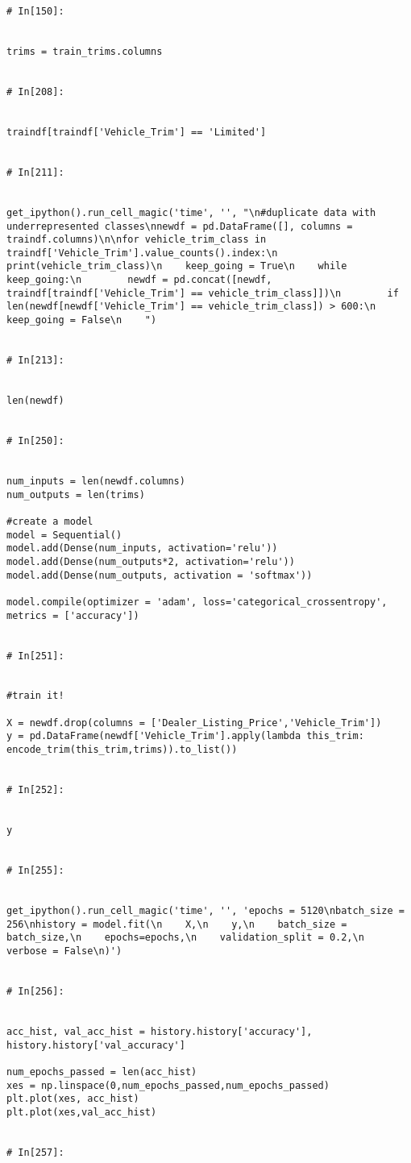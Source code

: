 \begin{verbatim}
# In[150]:


trims = train_trims.columns


# In[208]:


traindf[traindf['Vehicle_Trim'] == 'Limited']


# In[211]:


get_ipython().run_cell_magic('time', '', "\n#duplicate data with underrepresented classes\nnewdf = pd.DataFrame([], columns = traindf.columns)\n\nfor vehicle_trim_class in traindf['Vehicle_Trim'].value_counts().index:\n    print(vehicle_trim_class)\n    keep_going = True\n    while keep_going:\n        newdf = pd.concat([newdf, traindf[traindf['Vehicle_Trim'] == vehicle_trim_class]])\n        if len(newdf[newdf['Vehicle_Trim'] == vehicle_trim_class]) > 600:\n            keep_going = False\n    ")


# In[213]:


len(newdf)


# In[250]:


num_inputs = len(newdf.columns)
num_outputs = len(trims)

#create a model
model = Sequential()
model.add(Dense(num_inputs, activation='relu'))
model.add(Dense(num_outputs*2, activation='relu'))
model.add(Dense(num_outputs, activation = 'softmax'))

model.compile(optimizer = 'adam', loss='categorical_crossentropy', metrics = ['accuracy'])


# In[251]:


#train it!

X = newdf.drop(columns = ['Dealer_Listing_Price','Vehicle_Trim'])
y = pd.DataFrame(newdf['Vehicle_Trim'].apply(lambda this_trim: encode_trim(this_trim,trims)).to_list())


# In[252]:


y


# In[255]:


get_ipython().run_cell_magic('time', '', 'epochs = 5120\nbatch_size = 256\nhistory = model.fit(\n    X,\n    y,\n    batch_size = batch_size,\n    epochs=epochs,\n    validation_split = 0.2,\n    verbose = False\n)')


# In[256]:


acc_hist, val_acc_hist = history.history['accuracy'], history.history['val_accuracy']

num_epochs_passed = len(acc_hist)
xes = np.linspace(0,num_epochs_passed,num_epochs_passed)
plt.plot(xes, acc_hist)
plt.plot(xes,val_acc_hist)


# In[257]:



\end{verbatim}
